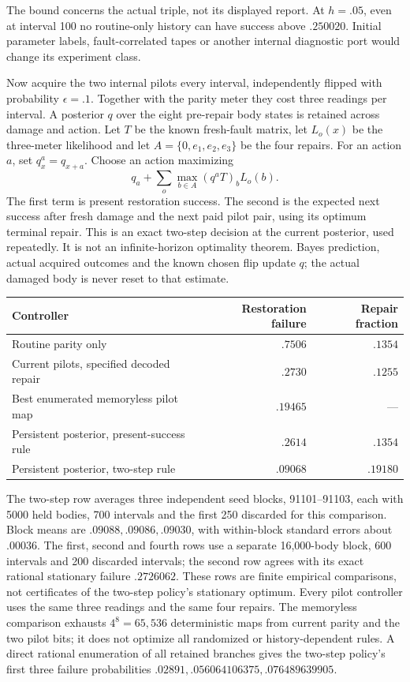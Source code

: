 \documentclass[12pt]{article}
\theoremstyle{definition}
\theoremstyle{remark}
\begin{document}
The bound concerns the actual triple, not its displayed report. At
$h=.05$, even at interval 100 no routine-only history can have success
above $.250020$. Initial parameter labels, fault-correlated tapes or
another internal diagnostic port would change its experiment class.

Now acquire the two internal pilots every interval, independently flipped
with probability $\epsilon=.1$. Together with the parity meter they cost
three readings per interval. A posterior $q$ over the eight pre-repair
body states is retained across damage and action. Let $T$ be the known
fresh-fault matrix, let $L_o(x)$ be the three-meter likelihood and let
$A=\{0,e_1,e_2,e_3\}$ be the four repairs. For an action $a$, set
$q^a_x=q_{x+a}$. Choose an action maximizing
\begin{equation}\label{eq:recurrent-two-step}
 q_a+\sum_o\max_{b\in A}(q^aT)_bL_o(b).
\end{equation}
The first term is present restoration success. The second is the
expected next success after fresh damage and the next paid pilot pair,
using its optimum terminal repair. This is an exact two-step decision
at the current posterior, used repeatedly. It is not an infinite-horizon
optimality theorem. Bayes prediction, actual acquired outcomes and the
known chosen flip update $q$; the actual damaged body is never reset to
that estimate.

\begin{center}
\begin{tabular}{@{}lrr@{}}
\toprule
Controller & Restoration failure & Repair fraction\\
\midrule
Routine parity only & $.7506$ & $.1354$\\
Current pilots, specified decoded repair & $.2730$ & $.1255$\\
Best enumerated memoryless pilot map & $.19465$ & ---\\
Persistent posterior, present-success rule & $.2614$ & $.1354$\\
Persistent posterior, two-step rule & $.09068$ & $.19180$\\
\bottomrule
\end{tabular}
\end{center}

The two-step row averages three independent seed blocks, 91101--91103,
each with 5000 held bodies, 700 intervals and the first 250 discarded
for this comparison. Block means are $.09088,.09086,.09030$, with
within-block standard errors about $.00036$. The first, second and fourth
rows use a separate 16,000-body block, 600 intervals and 200 discarded
intervals; the second row agrees with its exact rational stationary
failure $.2726062$. These rows are finite empirical comparisons, not
certificates of the two-step policy's stationary optimum. Every pilot
controller uses the same three readings and the same four repairs.
The memoryless comparison exhausts $4^8=65,536$ deterministic maps
from current parity and the two pilot bits; it does not optimize all
randomized or history-dependent rules. A direct rational enumeration
of all retained branches gives the two-step policy's first three
failure probabilities $.02891,.056064106375,.076489639905$.
\end{document}
